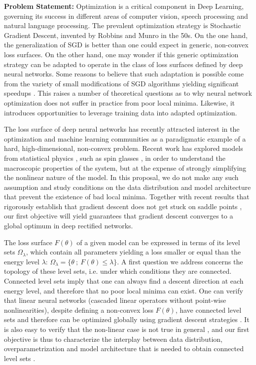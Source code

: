 \documentclass[10pt]{article}
\begin{document}
\vspace{0.5cm}
\noindent
\textbf{Problem Statement:}
Optimization is a critical component in Deep Learning, governing its success in different areas of computer vision, speech processing and natural language processing. The prevalent optimization strategy is Stochastic Gradient Descent, invented by Robbins and Munro in the 50s. On the one hand, the generalization of SGD is better than one could expect 
in generic, non-convex loss surfaces. On the other hand, one may wonder if this generic optimization strategy can be adapted to operate in the class of loss surfaces defined by deep neural networks. Some reasons to believe that such adaptation is possible come from the 
variety of small modifications of SGD algorithms yielding significant speedups \cite{duchi2011adaptive, hinton2012lecture, kingma2014adam}.
This raises a number of theoretical questions as to why neural network optimization does not suffer in practice from poor local minima. Likewise, it introduces opportunities to leverage training data into adapted optimization. 

The loss surface of deep neural networks has recently attracted interest 
in the optimization and machine learning communities as a paradigmatic example of 
a hard, high-dimensional, non-convex problem. 
Recent work has explored models from statistical physics \cite{dauphin2014identifying}, such as spin glasses \cite{choromanska2015loss}, 
in order to understand the macroscopic properties of the system, but at the expense of strongly simplifying the nonlinear nature of the model.
In this proposal, we do not make any such assumption and study conditions 
on the data distribution and model architecture that prevent the existence 
of bad local minima. Together with 
recent results that rigorously establish that gradient descent does not 
get stuck on saddle points \cite{lee2016gradient}, our first objective will yield guarantees that gradient descent converges
to a global optimum in deep rectified networks. 

The loss surface $F(\theta)$ of a given model can be expressed in terms of its level sets $\Omega_\lambda$, which contain all parameters yielding a loss smaller or equal than the energy level $\lambda$: $\Omega_\lambda = \{ \theta ~;~F(\theta) \leq \lambda\}$. 
A first question we address concerns the topology of these level sets, i.e. under which conditions they are connected. Connected level sets imply that one can always find a descent direction at each energy level, and therefore that no poor local minima can exist. One can verify that linear neural networks (cascaded linear operators without point-wise nonlinearities), despite defining a non-convex loss $F(\theta)$, have connected level sets and therefore can be optimized globally using gradient descent strategies \cite{danieljoan}. It is also easy to verify that the non-linear case is not true in general \cite{shamir}, and our first objective is thus to characterize the interplay between data distribution, overparametrization and model architecture that is needed to obtain connected level sets \cite{danieljoan}.
\end{document}
